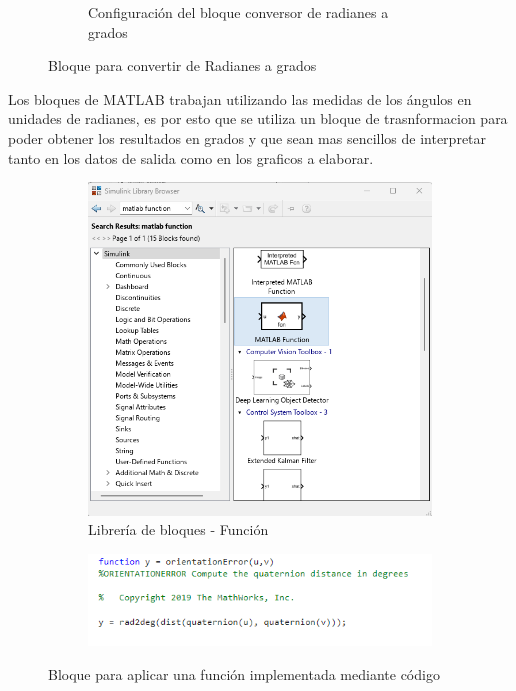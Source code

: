 \begin{figure}[htbp]
\begin{subfigure}[b]{0.45\textwidth}
        \caption{Configuración del bloque conversor de radianes a grados}
        \label{fig:conf_bloques_R2D}
    \end{subfigure}
    \caption{Bloque para convertir de Radianes a grados}
    \label{fig:bloques_R2D}
\end{figure}

Los bloques de MATLAB trabajan utilizando las medidas de los ángulos en unidades de radianes, es por esto que se utiliza un bloque de trasnformacion para poder obtener los resultados en grados y que sean mas sencillos de interpretar tanto en los datos de salida como en los graficos a elaborar.



\begin{figure}[htbp]
    \centering
    \begin{subfigure}[b]{0.35\textwidth}
        \centering
        \includegraphics[width=\textwidth]{fig/Capitulo5/Caso_de_estudio_IMU/Generador_de_salidas/libreria_bloque_de_funcion.png}
        \caption{Librería de bloques - Función}
        \label{fig:lib_bloques_func}
    \end{subfigure}
    \hfill
    \begin{subfigure}[b]{0.45\textwidth}
        \centering
        \includegraphics[width=\textwidth]{fig/Capitulo5/Caso_de_estudio_IMU/Generador_de_salidas/configuracion_codigo.png}
        \caption{}
        \label{fig:config_bloques_func}
    \end{subfigure}
    \caption{Bloque para aplicar una función implementada mediante código}
    \label{fig:bloques_func}
\end{figure}

